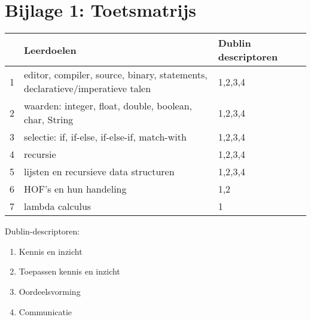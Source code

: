 \section*{Bijlage 1: Toetsmatrijs}
	\begin{tabular}{|p{1cm}|p{4cm}|p{4cm}|p{4cm}|}
		\hline
		& Leerdoelen & Dublin descriptoren \\
		\hline
		1 & editor, compiler, source, binary, statements, declaratieve/imperatieve talen & 1,2,3,4 \\
		\hline
		2 & waarden: integer, float, double, boolean, char, String & 1,2,3,4 \\
		\hline
		3 & selectie: if, if-else, if-else-if, match-with & 1,2,3,4 \\
		\hline
		4 & recursie & 1,2,3,4 \\
		\hline
		5 & lijsten en recursieve data structuren & 1,2,3,4 \\
		\hline
		6 & HOF's en hun handeling & 1,2 \\
		\hline
		7 & lambda calculus & 1 \\
		\hline
	\end{tabular}
	
	\vspace{1cm}

	Dublin-descriptoren:
	\begin{enumerate}
		\item Kennis en inzicht
		\item Toepassen kennis en inzicht
		\item Oordeelsvorming
		\item Communicatie
	\end{enumerate}